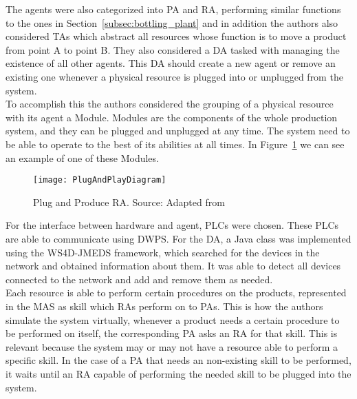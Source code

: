 
The agents were also categorized into \gls{PA} and \gls{RA}, performing similar functions to the ones in Section~\ref{subsec:bottling_plant} and in addition the authors also considered \gls{TA}s which abstract all resources whose function is to move a product from point A to point B. They also considered a \gls{DA} tasked with managing the existence of all other agents. This \gls{DA} should create a new agent or remove an existing one whenever a physical resource is plugged into or unplugged from the system.\\

To accomplish this the authors considered the grouping of a physical resource with its agent a Module. Modules are the components of the whole production system, and they can be plugged and unplugged at any time. The system need to be able to operate to the best of its abilities at all times. In Figure~\ref{fig:plug_and_play_device_architecture} we can see an example of one of these Modules.\\

\begin{figure}[h!]
	\centering
	\texttt{[image: PlugAndPlayDiagram]}
	\caption{Plug and Produce \gls{RA}. Source: Adapted from \cite{8972169}}
	\label{fig:plug_and_play_device_architecture}
\end{figure}

For the interface between hardware and agent, \gls{PLC}s were chosen. These \gls{PLC}s are able to communicate using \gls{DWPS}. For the \gls{DA}, a Java class was implemented using the \gls{WS4D-JMEDS} framework, which searched for the devices in the network and obtained information about them. It was able to detect all devices connected to the network and add and remove them as needed.\\

Each resource is able to perform certain procedures on the products, represented in the \gls{MAS} as skill which \gls{RA}s perform on to \gls{PA}s. This is how the authors simulate the system virtually, whenever a product needs a certain procedure to be performed on itself, the corresponding \gls{PA} asks an \gls{RA} for that skill. This is relevant because the system may or may not have a resource able to perform a specific skill. In the case of a \gls{PA} that needs an non-existing skill to be performed, it waits until an \gls{RA} capable of performing the needed skill to be plugged into the system.\\

